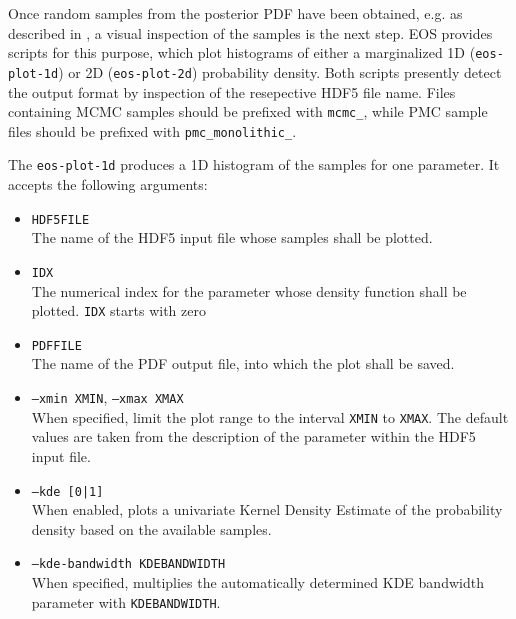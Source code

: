 Once random samples from the posterior PDF have been obtained, e.g. as described in
, a visual inspection of the samples is the next step.
EOS provides scripts for this purpose, which plot histograms of either
a marginalized 1D (\texttt{eos-plot-1d}) or 2D (\texttt{eos-plot-2d}) probability density.
Both scripts presently detect the output format by inspection of the resepective HDF5 file
name. Files containing MCMC samples should be prefixed with \texttt{mcmc\_}, while
PMC sample files should be prefixed with \texttt{pmc\_monolithic\_}.

The \texttt{eos-plot-1d} produces a 1D histogram of the samples for one parameter.
It accepts the following arguments:
\begin{itemize}
    \item[] \texttt{HDF5FILE}\\[\medskipamount]
        The name of the HDF5 input file whose samples shall be plotted.

    \item[] \texttt{IDX}\\[\medskipamount]
        The numerical index for the parameter whose density function shall
        be plotted. \texttt{IDX} starts with zero

    \item[] \texttt{PDFFILE}\\[\medskipamount]
        The name of the PDF output file, into which the plot shall be saved.

    \item[] \texttt{--xmin XMIN}, \texttt{--xmax XMAX}\\[\medskipamount]
        When specified, limit the plot range to the interval \texttt{XMIN} to \texttt{XMAX}.
        The default values are taken from the description of the parameter within the
        HDF5 input file.

    \item[] \texttt{--kde [0|1]}\\[\medskipamount]
        When enabled, plots a univariate Kernel Density Estimate of the probability
        density based on the available samples.

    \item[] \texttt{--kde-bandwidth KDEBANDWIDTH}\\[\medskipamount]
        When specified, multiplies the automatically determined KDE bandwidth parameter
        with \texttt{KDEBANDWIDTH}.
\end{itemize}

